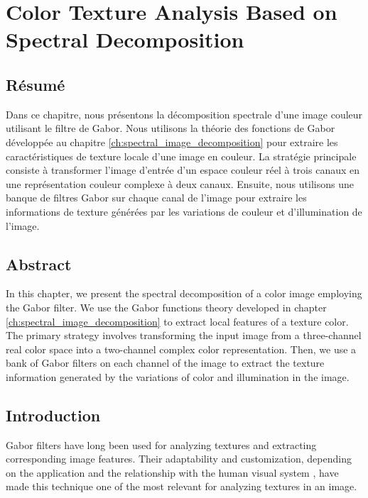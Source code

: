 
\chapter{Color Texture Analysis Based on Spectral Decomposition}\label{ch:complex_spectral_image_decomposition}
\section*{Résumé}
\noindent Dans ce chapitre, nous présentons la décomposition spectrale d'une image couleur utilisant le filtre de Gabor. Nous utilisons la théorie des fonctions de Gabor développée au chapitre \ref{ch:spectral_image_decomposition} pour extraire les caractéristiques de texture locale d'une image en couleur. La stratégie principale consiste à transformer l'image d'entrée d'un espace couleur réel à trois canaux en une représentation couleur complexe à deux canaux. Ensuite, nous utilisons une banque de filtres Gabor sur chaque canal de l'image pour extraire les informations de texture générées par les variations de couleur et d'illumination de l'image.

\section*{Abstract}
\noindent  In this chapter, we present the spectral decomposition of a color image employing the Gabor filter. We use the Gabor functions theory developed in chapter \ref{ch:spectral_image_decomposition} to extract local features of a texture color. The primary strategy involves transforming the input image from a three-channel real color space into a two-channel complex color representation. Then, we use a bank of Gabor filters on each channel of the image to extract the texture information generated by the variations of color and illumination in the image. 

\section{Introduction}

Gabor filters have long been used for analyzing textures and extracting corresponding image features. Their adaptability and customization, depending on the application and the relationship with the human visual system  \citep{Daugman:JOSA:1985}, have made this technique one of the most relevant for analyzing textures in an image. 

